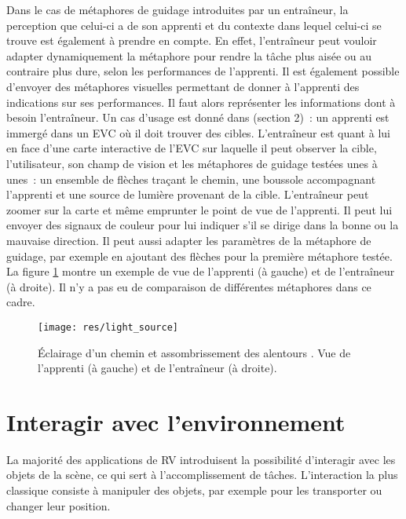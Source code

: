 \documentclass[11pt]{article}
\begin{document}
Dans le cas de métaphores de guidage introduites par un entraîneur, la perception que celui-ci a de son apprenti et du contexte dans lequel celui-ci se trouve est également à prendre en compte. En effet, l'entraîneur peut vouloir adapter dynamiquement la métaphore pour rendre la tâche plus aisée ou au contraire plus dure, selon les performances de l'apprenti. Il est également possible d'envoyer des métaphores visuelles permettant de donner à l'apprenti des indications sur ses performances. Il faut alors représenter les informations dont à besoin l'entraîneur. Un cas d'usage est donné dans \cite{thesis} (section 2)~: un apprenti est immergé dans un EVC où il doit trouver des cibles. L'entraîneur est quant à lui en face d'une carte interactive de l'EVC sur laquelle il peut observer la cible, l'utilisateur, son champ de vision et les métaphores de guidage testées unes à unes~: un ensemble de flèches traçant le chemin, une boussole accompagnant l'apprenti et une source de lumière provenant de la cible. L'entraîneur peut zoomer sur la carte et même emprunter le point de vue de l'apprenti. Il peut lui envoyer des signaux de couleur pour lui indiquer s'il se dirige dans la bonne ou la mauvaise direction. Il peut aussi adapter les paramètres de la métaphore de guidage, par exemple en ajoutant des flèches pour la première métaphore testée. La figure \ref{fig:light-source} montre un exemple de vue de l'apprenti (à gauche) et de l'entraîneur (à droite). Il n'y a pas eu de comparaison de différentes métaphores dans ce cadre.

\begin{figure}
\centering
\texttt{[image: res/light\_source]}
\caption{\label{fig:light-source}Éclairage d'un chemin et assombrissement des alentours \cite{thesis}. Vue de l'apprenti (à gauche) et de l'entraîneur (à droite).}
\end{figure}

\section{Interagir avec l'environnement}

La majorité des applications de RV introduisent la possibilité d'interagir avec les objets de la scène, ce qui sert à l'accomplissement de t\^aches. L'interaction la plus classique consiste à manipuler des objets, par exemple pour les transporter ou changer leur position.
\end{document}
